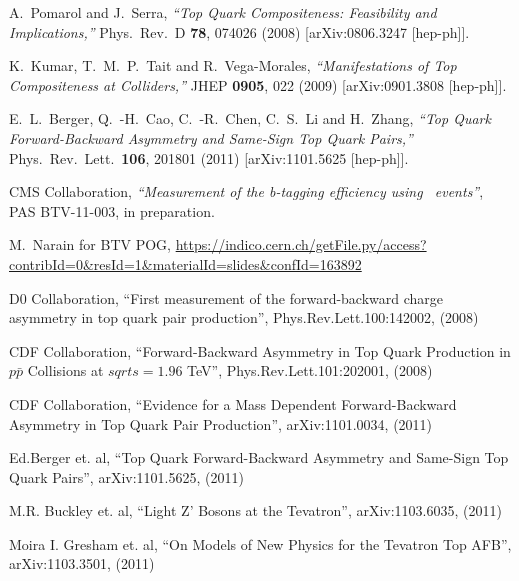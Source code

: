 \begin{thebibliography}{99}
  A.~Pomarol and J.~Serra,
  {\it ``Top Quark Compositeness: Feasibility and Implications,''}
  Phys.\ Rev.\ D {\bf 78}, 074026 (2008)
  [arXiv:0806.3247 [hep-ph]].


  K.~Kumar, T.~M.~P.~Tait and R.~Vega-Morales,
  {\it ``Manifestations of Top Compositeness at Colliders,''}
  JHEP {\bf 0905}, 022 (2009)
  [arXiv:0901.3808 [hep-ph]].


  E.~L.~Berger, Q.~-H.~Cao, C.~-R.~Chen, C.~S.~Li and H.~Zhang,
  {\it ``Top Quark Forward-Backward Asymmetry and Same-Sign Top Quark Pairs,''}
  Phys.\ Rev.\ Lett.\  {\bf 106}, 201801 (2011)
  [arXiv:1101.5625 [hep-ph]].

 CMS Collaboration, {{\it ``Measurement of the b-tagging efficiency using \ttbar\ events''}}, 
	PAS BTV-11-003, in preparation.

 M.~Narain for BTV POG, \url{https://indico.cern.ch/getFile.py/access?contribId=0&resId=1&materialId=slides&confId=163892}

 {D0 Collaboration, ``First measurement of the forward-backward charge asymmetry in top quark pair production'', Phys.Rev.Lett.100:142002, (2008)}

 {CDF Collaboration, ``Forward-Backward Asymmetry in Top Quark Production in $p\bar{p}$ Collisions at $sqrt{s}=1.96$ TeV'', Phys.Rev.Lett.101:202001, (2008)}

 {CDF Collaboration, ``Evidence for a Mass Dependent Forward-Backward Asymmetry in Top Quark Pair Production'', arXiv:1101.0034, (2011)}

 {Ed.Berger et. al, ``Top Quark Forward-Backward Asymmetry and Same-Sign Top Quark Pairs'', arXiv:1101.5625, (2011)}

 {M.R. Buckley et. al, ``Light Z' Bosons at the Tevatron'', arXiv:1103.6035, (2011)}

 {Moira I. Gresham et. al, ``On Models of New Physics for the Tevatron Top AFB'', arXiv:1103.3501, (2011)}


\end{thebibliography}

